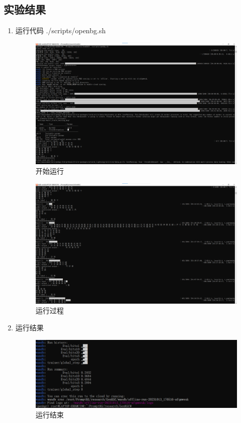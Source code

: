 \documentclass{article}
\begin{document}
\subsection{实验结果}
\begin{enumerate}
    \item 运行代码 ./scripts/openbg.sh
\begin{figure}[htp]
        \centering
        \includegraphics[width=16cm]{run.png}
        \caption{开始运行}
        \label{pic7}
\end{figure}
\begin{figure}[htp]
        \centering
        \includegraphics[width=16cm]{过程.png}
        \caption{运行过程}
        \label{pic7}
\end{figure} 
    
    \item 运行结果
    \begin{figure}[htp]
        \centering
        \includegraphics[width=16cm]{最终结果.png}
        \caption{运行结束}
        \label{pic7}    
    \end{figure} 
\end{enumerate}
\end{document}
